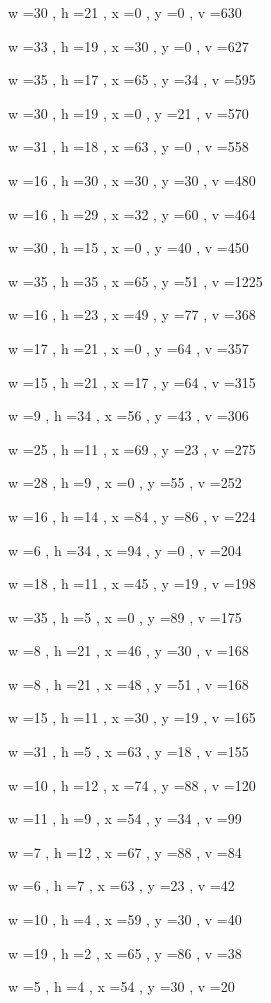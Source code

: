 \documentclass[11pt]{article}
\begin{document}
w =30 , h =21 , x =0 , y =0 , v =630
\par
w =33 , h =19 , x =30 , y =0 , v =627
\par
w =35 , h =17 , x =65 , y =34 , v =595
\par
w =30 , h =19 , x =0 , y =21 , v =570
\par
w =31 , h =18 , x =63 , y =0 , v =558
\par
w =16 , h =30 , x =30 , y =30 , v =480
\par
w =16 , h =29 , x =32 , y =60 , v =464
\par
w =30 , h =15 , x =0 , y =40 , v =450
\par
w =35 , h =35 , x =65 , y =51 , v =1225
\par
w =16 , h =23 , x =49 , y =77 , v =368
\par
w =17 , h =21 , x =0 , y =64 , v =357
\par
w =15 , h =21 , x =17 , y =64 , v =315
\par
w =9 , h =34 , x =56 , y =43 , v =306
\par
w =25 , h =11 , x =69 , y =23 , v =275
\par
w =28 , h =9 , x =0 , y =55 , v =252
\par
w =16 , h =14 , x =84 , y =86 , v =224
\par
w =6 , h =34 , x =94 , y =0 , v =204
\par
w =18 , h =11 , x =45 , y =19 , v =198
\par
w =35 , h =5 , x =0 , y =89 , v =175
\par
w =8 , h =21 , x =46 , y =30 , v =168
\par
w =8 , h =21 , x =48 , y =51 , v =168
\par
w =15 , h =11 , x =30 , y =19 , v =165
\par
w =31 , h =5 , x =63 , y =18 , v =155
\par
w =10 , h =12 , x =74 , y =88 , v =120
\par
w =11 , h =9 , x =54 , y =34 , v =99
\par
w =7 , h =12 , x =67 , y =88 , v =84
\par
w =6 , h =7 , x =63 , y =23 , v =42
\par
w =10 , h =4 , x =59 , y =30 , v =40
\par
w =19 , h =2 , x =65 , y =86 , v =38
\par
w =5 , h =4 , x =54 , y =30 , v =20
\par
\newpage
\end{document}
